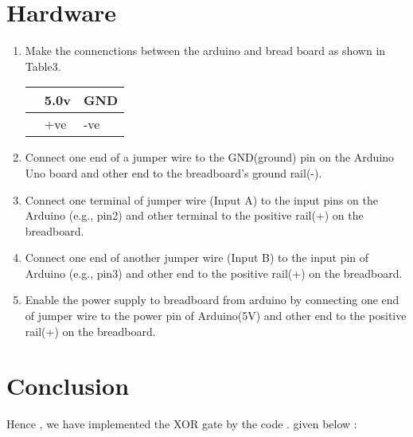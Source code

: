 \documentclass[10pt,a4paper]{article}
\begin{document}
     \section{Hardware}
	     \begin{enumerate}
		     \item Make the connenctions between the arduino and bread board as shown in Table3.
			     \begin{table}[h]
				     \centering
				     \begin{tabularx}{0.5\textwidth}
					     {
						     | >{\centering\arraybackslash}X
						     | >{\centering\arraybackslash}X
						     | >{\centering\arraybackslash}X |}
						     \hline
						     {\bf Arduino} & 5.0v & GND \\
						     \hline
						     {\bf Bread Board} & +ve & -ve  \\
						     \hline
				     \end{tabularx}
			     \end{table}
			     \item Connect one end of a jumper wire to the GND(ground) pin on the Arduino Uno board
				     and  other end to the   breadboard’s ground rail(-).
                             \item Connect one terminal of jumper wire (Input A) to the input pins on the Arduino
				     (e.g., pin2) and other terminal to
				     the positive rail(+) on the breadboard.
			     \item Connect one end of another jumper wire (Input B) to the input pin of Arduino
				     (e.g., pin3) and other end to the 
				     positive rail(+) on the breadboard.
			     \item Enable the power supply to breadboard from arduino by connecting one end of 
			             jumper wire to the power pin of Arduino(5V) and other end to the positive 
				     rail(+) on the breadboard.
	     \end{enumerate}
     \section{Conclusion}
	     Hence , we have implemented the XOR gate by the code . given below : \\
\end{document}
